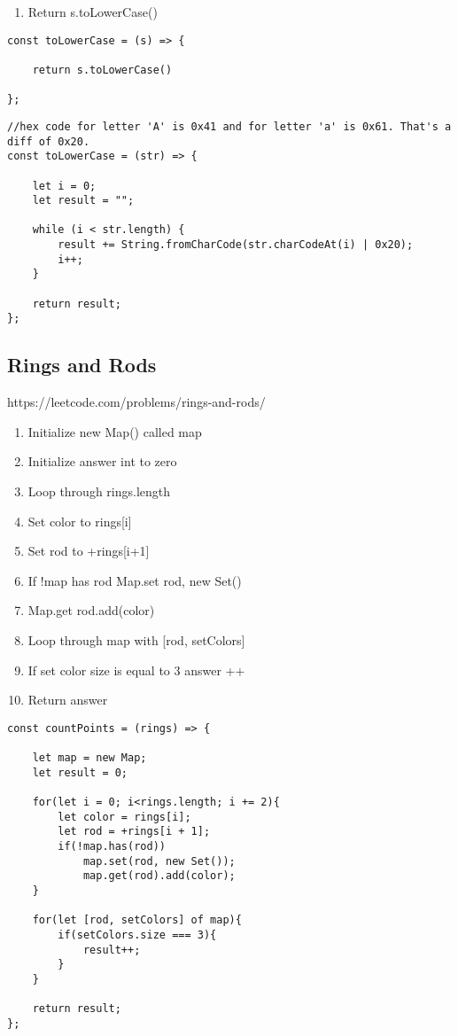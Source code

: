 \documentclass[10pt]{article}
\begin{document}
\begin{enumerate}
	\item Return s.toLowerCase()
\end{enumerate}

\begin{lstlisting}[title=Solution toLowerCase, captionpos=t]
const toLowerCase = (s) => {

    return s.toLowerCase()
    
};
\end{lstlisting}

\begin{lstlisting}[title=Solution toLowerCase with hex code, captionpos=t]
//hex code for letter 'A' is 0x41 and for letter 'a' is 0x61. That's a diff of 0x20.
const toLowerCase = (str) => {

    let i = 0;
    let result = "";
    
    while (i < str.length) {
        result += String.fromCharCode(str.charCodeAt(i) | 0x20);
        i++;
    }
    
    return result;
};
\end{lstlisting}
\medskip %


\pagebreak %
\medskip 
\subsection{Rings and Rods}
https://leetcode.com/problems/rings-and-rods/

\begin{enumerate}
	\item Initialize new Map() called map
	\item Initialize answer int to zero 
	\item Loop through rings.length 
	\item Set color to rings[i]
	\item Set rod to +rings[i+1]
	\item If !map has rod Map.set rod, new Set()
	\item Map.get rod.add(color)
	\item Loop through map with [rod, setColors]
	\item If set color size is equal to 3 answer ++
	\item Return answer
\end{enumerate}

\begin{lstlisting}[title=Solution countPoints, captionpos=t]
const countPoints = (rings) => {
    
    let map = new Map;
    let result = 0;
    
    for(let i = 0; i<rings.length; i += 2){
        let color = rings[i];
        let rod = +rings[i + 1];
        if(!map.has(rod))
            map.set(rod, new Set());
            map.get(rod).add(color);
    }
    
    for(let [rod, setColors] of map){
        if(setColors.size === 3){
            result++;
        }
    }
    
    return result;
};
\end{lstlisting}
\end{document}
